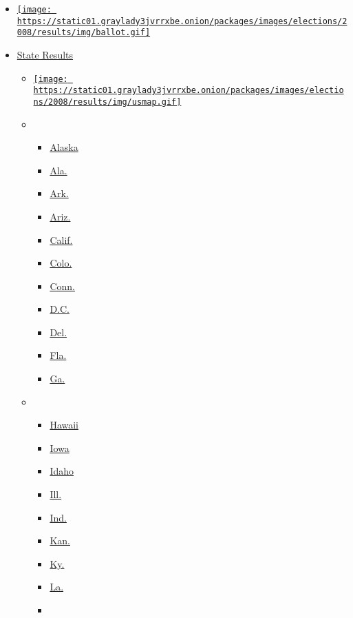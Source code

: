\begin{itemize}
\tightlist
\item
  \href{../president/map.html}{\texttt{[image: https://static01.graylady3jvrrxbe.onion/packages/images/elections/2008/results/img/ballot.gif]}}
\item
  \protect\hyperlink{}{State Results}

  \begin{itemize}
  \item
    \href{//www.adobe.com/shockwave/download/download.cgi?P1_Prod_Version=ShockwaveFlash}{\texttt{[image: https://static01.graylady3jvrrxbe.onion/packages/images/elections/2008/results/img/usmap.gif]}}
  \item
    \begin{itemize}
    \tightlist
    \item
      \href{alaska.html}{Alaska}
    \item
      \href{alabama.html}{Ala.}
    \item
      \href{arkansas.html}{Ark.}
    \item
      \href{arizona.html}{Ariz.}
    \item
      \href{california.html}{Calif.}
    \item
      \href{colorado.html}{Colo.}
    \item
      \href{connecticut.html}{Conn.}
    \item
      \href{district-of-columbia.html}{D.C.}
    \item
      \href{delaware.html}{Del.}
    \item
      \href{florida.html}{Fla.}
    \item
      \href{georgia.html}{Ga.}
    \end{itemize}
  \item
    \begin{itemize}
    \tightlist
    \item
      \href{hawaii.html}{Hawaii}
    \item
      \href{iowa.html}{Iowa}
    \item
      \href{idaho.html}{Idaho}
    \item
      \href{illinois.html}{Ill.}
    \item
      \href{indiana.html}{Ind.}
    \item
      \href{kansas.html}{Kan.}
    \item
      \href{kentucky.html}{Ky.}
    \item
      \href{louisiana.html}{La.}
    \item

\end{itemize}
\end{itemize}
\end{itemize}
